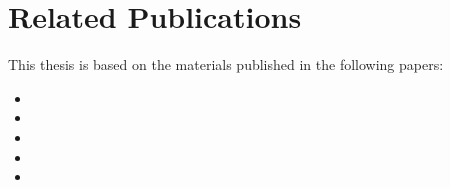 \section{Related Publications}

This thesis is based on the materials published in the following papers:

\begin{itemize}
      \item {}
      \item {}
      \item {}
      \item {}
      \item {}
\end{itemize}
